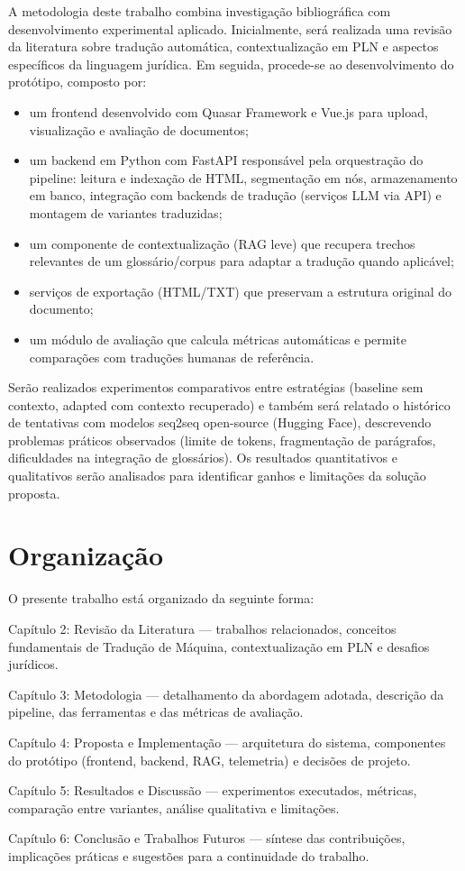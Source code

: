 A metodologia deste trabalho combina investigação bibliográfica com desenvolvimento experimental aplicado. Inicialmente, será realizada uma revisão da literatura sobre tradução automática, contextualização em PLN e aspectos específicos da linguagem jurídica. Em seguida, procede-se ao desenvolvimento do protótipo, composto por:

\begin{itemize}
    \item um frontend desenvolvido com Quasar Framework e Vue.js para upload, visualização e avaliação de documentos;
    \item um backend em Python com FastAPI responsável pela orquestração do pipeline: leitura e indexação de HTML, segmentação em nós, armazenamento em banco, integração com backends de tradução (serviços LLM via API) e montagem de variantes traduzidas;
    \item um componente de contextualização (RAG leve) que recupera trechos relevantes de um glossário/corpus para adaptar a tradução quando aplicável;
    \item serviços de exportação (HTML/TXT) que preservam a estrutura original do documento;
    \item um módulo de avaliação que calcula métricas automáticas e permite comparações com traduções humanas de referência.
\end{itemize}

Serão realizados experimentos comparativos entre estratégias (baseline sem contexto, adapted com contexto recuperado) e também será relatado o histórico de tentativas com modelos seq2seq open-source (Hugging Face), descrevendo problemas práticos observados (limite de tokens, fragmentação de parágrafos, dificuldades na integração de glossários). Os resultados quantitativos e qualitativos serão analisados para identificar ganhos e limitações da solução proposta.

\section{Organização}

O presente trabalho está organizado da seguinte forma:

Capítulo 2: Revisão da Literatura — trabalhos relacionados, conceitos fundamentais de Tradução de Máquina, contextualização em PLN e desafios jurídicos.

Capítulo 3: Metodologia — detalhamento da abordagem adotada, descrição da pipeline, das ferramentas e das métricas de avaliação.

Capítulo 4: Proposta e Implementação — arquitetura do sistema, componentes do protótipo (frontend, backend, RAG, telemetria) e decisões de projeto.

Capítulo 5: Resultados e Discussão — experimentos executados, métricas, comparação entre variantes, análise qualitativa e limitações.

Capítulo 6: Conclusão e Trabalhos Futuros — síntese das contribuições, implicações práticas e sugestões para a continuidade do trabalho.
